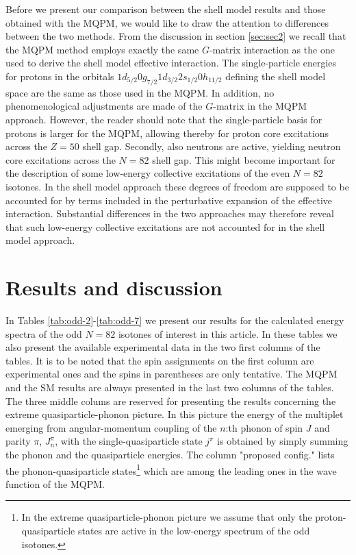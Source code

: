 Before we present our comparison between the shell model results and
those obtained with the MQPM, we would like to draw the attention
to differences between the two methods.
 From the discussion in section \ref{sec:sec2} we recall that 
the MQPM method employs exactly the same $G$-matrix 
interaction as the one used to derive the shell model effective interaction.
The single-particle energies for protons in the orbitals  
$1d_{5/2}0g_{7/2}1d_{3/2}2s_{1/2}0h_{11/2}$ defining the shell model
space are the same as those used in the MQPM. In addition, no phenomenological
adjustments are made of the $G$-matrix in the MQPM approach. 
However, the reader should note that the single-particle basis
for protons is larger for the MQPM, allowing thereby for proton
core excitations across the $Z=50$ shell gap. Secondly, 
also neutrons are active,  yielding neutron core excitations across the 
$N=82$ shell gap. This might become important for the description of some 
low-energy collective excitations of the even $N=82$ isotones. In the shell 
model approach these degrees of freedom are supposed to be accounted for by 
terms included in the perturbative expansion of the effective interaction.
Substantial differences in the two approaches may therefore
reveal that such low-energy collective excitations are not accounted
for in the shell model approach.

\section{Results and discussion}\label{sec:sec4}

In Tables \ref{tab:odd-2}-\ref{tab:odd-7} we present our results 
for the calculated energy spectra
of the odd $N=82$ isotones of interest in this article. 
In these tables
we also present the available experimental data in the 
two first columns of the tables. It is to be noted that 
the spin assignments on the first
column are experimental ones and the spins in parentheses are only 
tentative. The MQPM and the SM results are always 
presented in the last
two columns of the tables.
The three middle colums are reserved for presenting 
the results concerning
the extreme quasiparticle-phonon picture. In this picture the energy
of the multiplet emerging from angular-momentum coupling 
of the $n$:th
phonon of spin $J$ and parity $\pi$, $J_n^{\pi}$, with the 
single-quasiparticle state $j^{\pi}$ is obtained by simply summing the 
phonon and the quasiparticle energies. The column "proposed config."
lists the phonon-quasiparticle states\footnote{In the extreme 
quasiparticle-phonon picture we assume that only the proton-quasiparticle 
states are active in the low-energy spectrum of the odd isotones.} which 
are among the leading ones in the wave function of the MQPM. 

